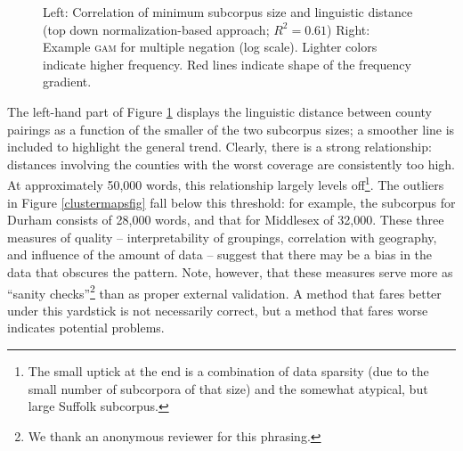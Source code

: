 \documentclass[output=paper]{LSP/langsci}
\begin{document}
\begin{figure}[tbp]
\begin{minipage}[b]{0.45\linewidth}
\end{minipage}
\caption{Left: Correlation of minimum subcorpus size and linguistic distance (top down normalization-based approach; $R^2=0.61$) Right: Example \textsc{gam} for multiple negation (log scale). Lighter colors indicate higher frequency. Red lines indicate shape of the frequency gradient.} \label{fig:cor-ling}
\end{figure}


The left-hand part of Figure \ref{fig:cor-ling} displays the linguistic distance between county pairings as a function of the smaller of the two subcorpus sizes; a smoother line is included to highlight the general trend.
Clearly, there is a strong relationship: distances involving the counties with the worst coverage are consistently too high. 
At approximately 50,000 words, this relationship largely levels off\footnote{The small uptick at the end is a combination of data sparsity (due to the small number of subcorpora of that size) and the somewhat atypical, but large Suffolk subcorpus.}.
The outliers in Figure \ref{clustermapsfig} fall below this threshold: for example, the subcorpus for Durham consists of 28,000 words, and that for Middlesex of 32,000.
These three measures of quality -- interpretability of groupings, correlation with geography, and influence of the amount of data -- suggest that there may be a bias in the data that obscures the pattern.
Note, however, that these measures serve more as ``sanity checks''\footnote{We thank an anonymous reviewer for this phrasing.} than as proper external validation.
A method that fares better under this yardstick is not necessarily correct, but a method that fares worse indicates potential problems.
\end{document}

